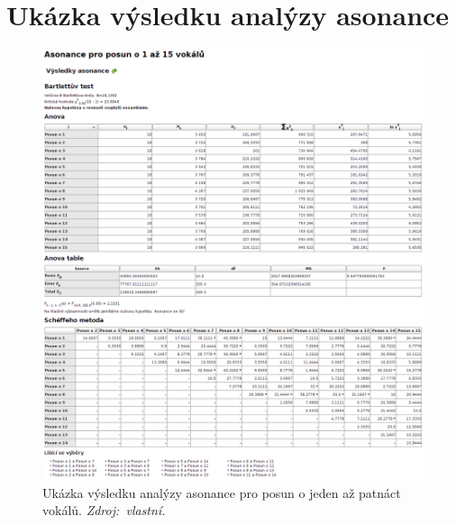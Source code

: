 \documentclass[dp.tex]{subfiles}
\begin{document}
\chapter{Ukázka výsledku analýzy asonance}
\label{appendix:asonance}
\begin{figure}[H]
	\centering
	\includegraphics[max width=\textwidth,keepaspectratio=true]{imgs-70-prakticka/assonance}
	\caption[Ukázka výsledku analýzy asonance pro posun o jeden až patnáct vokálů.]{Ukázka výsledku analýzy asonance pro posun o jeden až patnáct vokálů. \textit{Zdroj:~vlastní.}}
	\label{fig:denotation-resler-007}
\end{figure}
\end{document}
